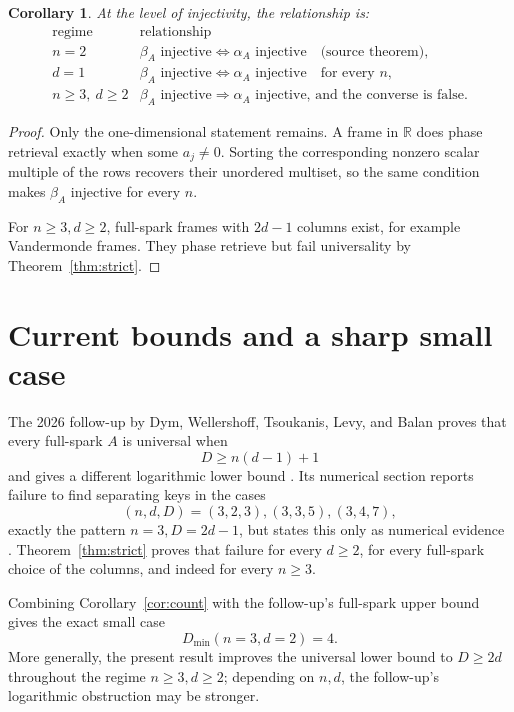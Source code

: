 \documentclass[11pt]{article}
\newtheorem{corollary}[theorem]{Corollary}
\newcommand{\R}{\mathbb R}
\begin{document}
\begin{corollary}\label{cor:classification}
At the level of injectivity, the relationship is:
\[
\begin{array}{c|c}
\text{regime}&\text{relationship}\\ \hline
n=2&\beta_A\text{ injective}\Longleftrightarrow
      \alpha_A\text{ injective}\quad\text{(source theorem)},\\
d=1&\beta_A\text{ injective}\Longleftrightarrow
      \alpha_A\text{ injective}\quad\text{for every }n,\\
n\ge3,\ d\ge2&\beta_A\text{ injective}\Longrightarrow
      \alpha_A\text{ injective, and the converse is false.}
\end{array}
\]
\end{corollary}

\begin{proof}
Only the one-dimensional statement remains.  A frame in \(\R\) does phase
retrieval exactly when some \(a_j\ne0\).  Sorting the corresponding nonzero
scalar multiple of the rows recovers their unordered multiset, so the same
condition makes \(\beta_A\) injective for every \(n\).

For \(n\ge3,d\ge2\), full-spark frames with \(2d-1\) columns exist, for
example Vandermonde frames.  They phase retrieve but fail universality by
Theorem~\ref{thm:strict}.
\end{proof}

\section{\texorpdfstring{\hspace{0.35em}}{}Current bounds and a sharp small case}

The 2026 follow-up by Dym, Wellershoff, Tsoukanis, Levy, and Balan proves that
every full-spark \(A\) is universal when
\[
 D\ge n(d-1)+1
\]
and gives a different logarithmic lower bound \cite[Theorems 4 and 5]{DWTLB}.
Its numerical section reports failure to find separating keys in the cases
\[
 (n,d,D)=(3,2,3),(3,3,5),(3,4,7),
\]
exactly the pattern \(n=3,D=2d-1\), but states this only as numerical
evidence \cite[Sec.~IV]{DWTLB}.  Theorem~\ref{thm:strict} proves that failure
for every \(d\ge2\), for every full-spark choice of the columns, and indeed
for every \(n\ge3\).

Combining Corollary~\ref{cor:count} with the follow-up's full-spark upper
bound gives the exact small case
\[
 D_{\min}(n=3,d=2)=4.
\]
More generally, the present result improves the universal lower bound to
\(D\ge2d\) throughout the regime \(n\ge3,d\ge2\); depending on \(n,d\), the
follow-up's logarithmic obstruction may be stronger.
\end{document}
